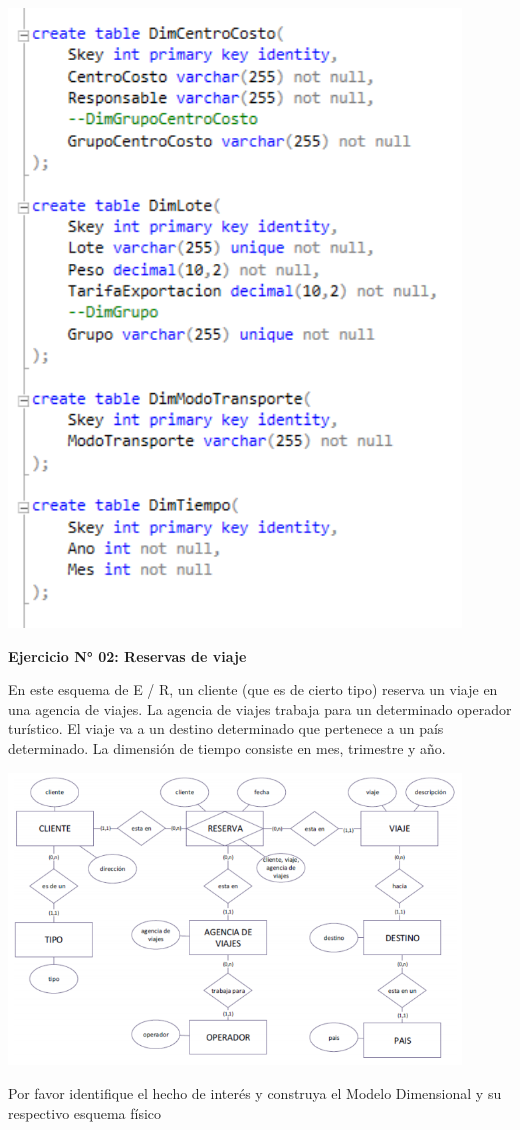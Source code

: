 \begin{center}
\includegraphics[width=12cm]{./Imagenes/15}
\end{center}

\newpage
\textbf{Ejercicio N° 02: Reservas de viaje}
\item{En este esquema de E / R, un cliente (que es de cierto tipo) reserva un viaje en una agencia de viajes. La agencia de viajes trabaja para un determinado operador turístico. El viaje va a un destino determinado que pertenece a un país determinado.
La dimensión de tiempo consiste en mes, trimestre y año.}

\begin{center}
\includegraphics[width=12cm]{./Imagenes/2}
\end{center}
\item{Por favor identifique el hecho de interés y construya el Modelo Dimensional y su respectivo esquema físico}

